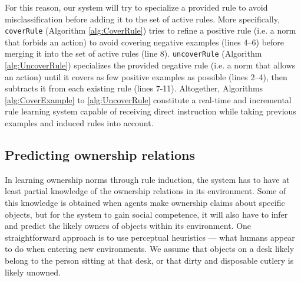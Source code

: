\documentclass[letterpaper]{article} %
\begin{document}
For this reason, our system will try to specialize a provided rule to avoid misclassification before adding it to the set of active rules. More specifically, \texttt{\small{coverRule}} (Algorithm \ref{alg:CoverRule}) tries to refine a positive rule (i.e. a norm that forbids an action) to avoid covering negative examples (lines 4--6) before merging it into the set of active rules (line 8). \texttt{\small{uncoverRule}} (Algorithm \ref{alg:UncoverRule}) specializes the provided negative rule (i.e. a norm that allows an action) until it covers as few positive examples as possible (lines 2--4), then subtracts it from each existing rule (lines 7-11). Altogether, Algorithms \ref{alg:CoverExample} to \ref{alg:UncoverRule} constitute a real-time and incremental rule learning system capable of receiving direct instruction while taking previous examples and induced rules into account.


\subsection{Predicting ownership relations}

In learning ownership norms through rule induction, the system has to have at least partial knowledge of the ownership relations in its environment. Some of this knowledge is obtained when agents make ownership claims about specific objects, but for the system to gain social competence, it will also have to infer and predict the likely owners of objects within its environment. One straightforward approach is to use perceptual heuristics --- what humans appear to do when entering new environments. We assume that objects on a desk likely belong to the person sitting at that desk, or that dirty and disposable cutlery is likely unowned.
\end{document}
